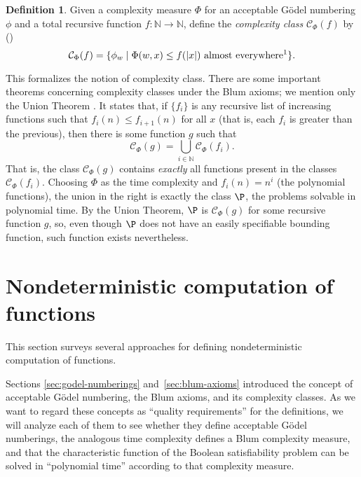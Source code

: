 \documentclass[12pt]{article}
\theoremstyle{definition}
\newtheorem{definition}{Definition}
\begin{document}
\begin{definition}
    Given a complexity measure $\Phi$ for an acceptable Gödel numbering $\phi$
    and a total recursive function $f : \mathbb N \to \mathbb N$,
    define the \emph{complexity class} $\mathcal C_\Phi(f)$ by
    (\cite[p.~232]{Kozen2006})
    \begin{equation*}
        \mathcal C_\Phi(f) = \{
            \phi_w \mid \Phi(w, x) \leq f(|x|)\ \text{almost everywhere\footnotemark}
        \}.
    \end{equation*}
\end{definition}

This formalizes the notion of complexity class.
There are some important theorems concerning complexity classes
under the Blum axioms;
we mention only the Union Theorem \cite[p.~234]{Kozen2006}.
It states that,
if $\{f_i\}$ is any recursive list of increasing functions
such that $f_i(n) \leq f_{i+1}(n)$ for all $x$
(that is, each $f_i$ is greater than the previous),
then there is some function $g$ such that
\begin{equation*}
    \mathcal C_\Phi(g) = \bigcup_{i \in \mathbb N} \mathcal C_\Phi(f_i).
\end{equation*}
That is, the class $\mathcal C_\Phi(g)$ contains \emph{exactly}
all functions present in the classes $\mathcal C_\Phi(f_i)$.
Choosing $\Phi$ as the time complexity and $f_i(n) = n^i$
(the polynomial functions),
the union in the right is exactly the class $\P$,
the problems solvable in polynomial time.
By the Union Theorem, $\P$ is $\mathcal C_\Phi(g)$
for some recursive function $g$,
so, even though $\P$ does not have an easily specifiable bounding function,
such function exists nevertheless.

\section{Nondeterministic computation of functions}
\label{sec:nondeterministic_computation_of_functions}

This section surveys several approaches
for defining nondeterministic computation of functions.

Sections \ref{sec:godel-numberings} and~\ref{sec:blum-axioms}
introduced the concept of acceptable Gödel numbering,
the Blum axioms,
and its complexity classes.
As we want to regard these concepts as ``quality requirements''
for the definitions,
we will analyze each of them to see whether they define acceptable Gödel numberings,
the analogous time complexity defines a Blum complexity measure,
and that the characteristic function of the Boolean satisfiability problem
can be solved in ``polynomial time'' according to that complexity measure.
\end{document}
